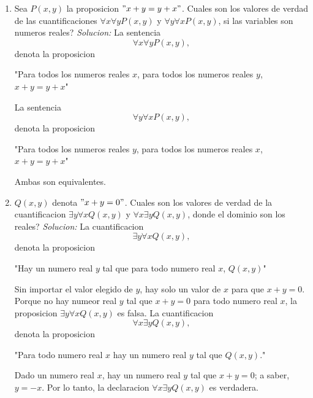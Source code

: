 \documentclass[]{article}
\begin{document}
\begin{enumerate}
	\item Sea $P(x, y)$ la proposicion $"x + y = y + x"$. Cuales son los valores de verdad de las cuantificaciones $\forall x \forall y P(x, y)$ y $\forall y \forall x P(x, y)$, si las variables son numeros reales?
	\textit{Solucion:}
	La sentencia
	\begin{equation*}
		\forall x\forall y P(x,y),
	\end{equation*}
	denota la proposicion
	\begin{center}
		"Para todos los numeros reales $x$, para todos los numeros reales $y$, $x + y = y + x$"
	\end{center}
	La sentencia
	\begin{equation*}
		\forall y\forall x P(x,y),
	\end{equation*}
	denota la proposicion
	\begin{center}
		"Para todos los numeros reales $y$, para todos los numeros reales $x$, $x + y = y + x$"
	\end{center}
	Ambas son equivalentes.

	\item $Q(x,y)$ denota $"x + y = 0"$. Cuales son los valores de verdad de la cuantificacion $\exists y \forall x Q(x,y)$ y $\forall x \exists y Q(x,y)$, donde el dominio son los reales?
	\textit{Solucion:}
	La cuantificacion
	\begin{equation*}
		\exists y \forall x Q(x,y),
	\end{equation*}
	denota la proposicion
	\begin{center}
		"Hay un numero real $y$ tal que para todo numero real $x$, $Q(x,y)$"
	\end{center}
	Sin importar el valor elegido de $y$, hay solo un valor de $x$ para que $x + y = 0$. Porque no hay numeor real $y$ tal que $x + y = 0$ para todo numero real $x$, la proposicion $\exists y \forall x Q(x,y)$ es falsa.
	La cuantificacion
	\begin{equation*}
		\forall x \exists y Q(x,y),
	\end{equation*}
	denota la proposicion
	\begin{center}
		"Para todo numero real $x$ hay un numero real $y$ tal que $Q(x,y)$."
	\end{center}
	Dado un numero real $x$, hay un numero real $y$ tal que $x + y = 0$; a saber, $y = -x$. Por lo tanto, la declaracion $\forall x \exists y Q(x,y)$ es verdadera.
\end{enumerate}
\end{document}
